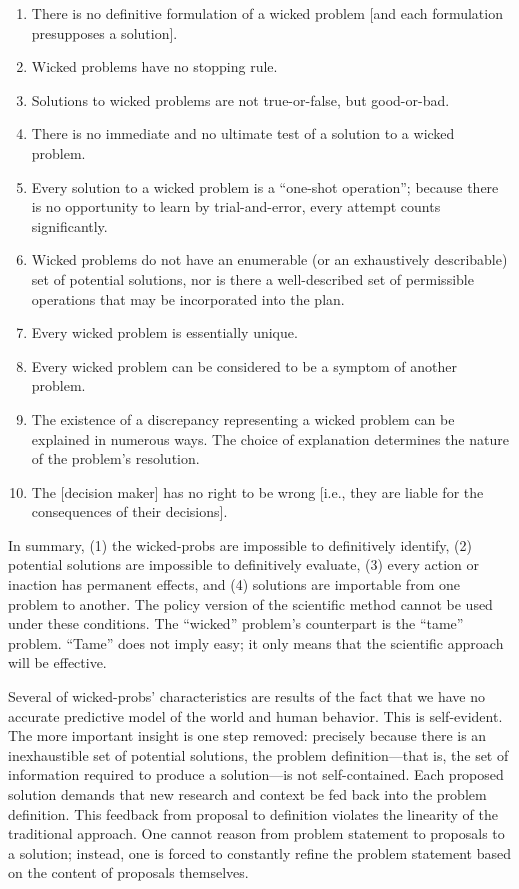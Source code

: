 \begin{displayquote}
  \begin{enumerate}
    \item There is no definitive formulation of a wicked problem [and each formulation presupposes a solution].
    \item Wicked problems have no stopping rule.
    \item Solutions to wicked problems are not true-or-false, but good-or-bad.
    \item There is no immediate and no ultimate test of a solution to a wicked problem.
    \item Every solution to a wicked problem is a ``one-shot operation''; because there is no opportunity to learn by
          trial-and-error, every attempt counts significantly.
    \item Wicked problems do not have an enumerable (or an exhaustively describable) set of potential solutions, nor is
          there a well-described set of permissible operations that may be incorporated into the plan.
    \item Every wicked problem is essentially unique.
    \item Every wicked problem can be considered to be a symptom of another problem.
    \item The existence of a discrepancy representing a wicked problem can be explained in numerous ways. The choice of
          explanation determines the nature of the problem's resolution.
    \item The [decision maker] has no right to be wrong [i.e., they are liable for the consequences of their decisions].
  \end{enumerate}
\end{displayquote}

In summary, (1) the \acp{wicked-prob} are impossible to definitively identify, (2) potential solutions are impossible to
definitively evaluate, (3) every action or inaction has permanent effects, and (4) solutions are importable from one
problem to another. The policy version of the scientific method cannot be used under these conditions. The ``wicked''
problem's counterpart is the ``tame'' problem. ``Tame'' does not imply easy; it only means that the scientific approach
will be effective.

Several of \acp{wicked-prob}' characteristics are results of the fact that we have no accurate predictive model of the
world and human behavior. This is self-evident. The more important insight is one step removed: precisely because there
is an inexhaustible set of potential solutions, the problem definition---that is, the set of information required to
produce a solution---is not self-contained. Each proposed solution demands that new research and context be fed back
into the problem definition. This feedback from proposal to definition violates the linearity of the traditional
approach. One cannot reason from problem statement to proposals to a solution; instead, one is forced to constantly
refine the problem statement based on the content of proposals themselves.


